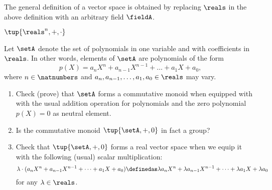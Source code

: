 \begin{remark}
    The general definition of a vector space is obtained by replacing $\reals$ in the above definition with an arbitrary field $\fieldA$.
\end{remark}

\begin{example}
    $\tup{\reals^n, +, \cdot}$
\end{example}



\begin{gradedexercise}
    \label{ex:real-polynomials}

    Let $\setA$ denote the set of polynomials in one variable and with coefficients in $\reals$. In other words, elements of $\setA$ are polynomials of the form
    \begin{equation}
    p(X) = a_nX^n + a_{n-1}X^{n-1} + \dots + a_1X + a_0,
    \end{equation}
    where $n \in \natnumbers$ and $a_n, a_{n-1}, \dots, a_1, a_0 \in \reals$ may vary. 
    
    \begin{enumerate}
    \item Check (prove) that $\setA$ forms a commutative monoid when equipped with with the usual addition operation for polynomials and the zero polynomial $p(X) = 0$ as neutral element. 
    \item Is the commutative monoid $\tup{\setA, +, 0}$ in fact a group? 
    \item Check that $\tup{\setA, +, 0}$ forms a real vector space when we equip it with the following (usual) scalar multiplication: 
    \begin{equation}
\lambda \cdot (a_nX^n + a_{n-1}X^{n-1} + \dots + a_1X + a_0) \definedas \lambda a_nX^n + \lambda a_{n-1}X^{n-1} + \dots + \lambda a_1X + \lambda a_0
\end{equation}
for any $\lambda \in \reals$. 
            \end{enumerate}
\end{gradedexercise}


